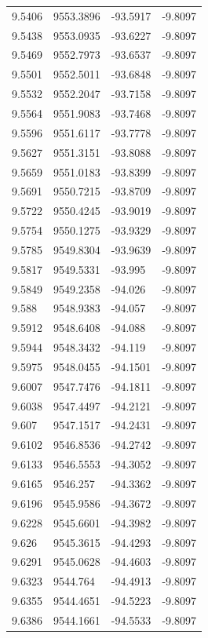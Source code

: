\begin{table}[H]
\begin{tabular}{llll}
9.5406 & 9553.3896 & -93.5917 & -9.8097 \\
9.5438 & 9553.0935 & -93.6227 & -9.8097 \\
9.5469 & 9552.7973 & -93.6537 & -9.8097 \\
9.5501 & 9552.5011 & -93.6848 & -9.8097 \\
9.5532 & 9552.2047 & -93.7158 & -9.8097 \\
9.5564 & 9551.9083 & -93.7468 & -9.8097 \\
9.5596 & 9551.6117 & -93.7778 & -9.8097 \\
9.5627 & 9551.3151 & -93.8088 & -9.8097 \\
9.5659 & 9551.0183 & -93.8399 & -9.8097 \\
9.5691 & 9550.7215 & -93.8709 & -9.8097 \\
9.5722 & 9550.4245 & -93.9019 & -9.8097 \\
9.5754 & 9550.1275 & -93.9329 & -9.8097 \\
9.5785 & 9549.8304 & -93.9639 & -9.8097 \\
9.5817 & 9549.5331 & -93.995 & -9.8097 \\
9.5849 & 9549.2358 & -94.026 & -9.8097 \\
9.588 & 9548.9383 & -94.057 & -9.8097 \\
9.5912 & 9548.6408 & -94.088 & -9.8097 \\
9.5944 & 9548.3432 & -94.119 & -9.8097 \\
9.5975 & 9548.0455 & -94.1501 & -9.8097 \\
9.6007 & 9547.7476 & -94.1811 & -9.8097 \\
9.6038 & 9547.4497 & -94.2121 & -9.8097 \\
9.607 & 9547.1517 & -94.2431 & -9.8097 \\
9.6102 & 9546.8536 & -94.2742 & -9.8097 \\
9.6133 & 9546.5553 & -94.3052 & -9.8097 \\
9.6165 & 9546.257 & -94.3362 & -9.8097 \\
9.6196 & 9545.9586 & -94.3672 & -9.8097 \\
9.6228 & 9545.6601 & -94.3982 & -9.8097 \\
9.626 & 9545.3615 & -94.4293 & -9.8097 \\
9.6291 & 9545.0628 & -94.4603 & -9.8097 \\
9.6323 & 9544.764 & -94.4913 & -9.8097 \\
9.6355 & 9544.4651 & -94.5223 & -9.8097 \\
9.6386 & 9544.1661 & -94.5533 & -9.8097 \\

\end{tabular}
\end{table}
